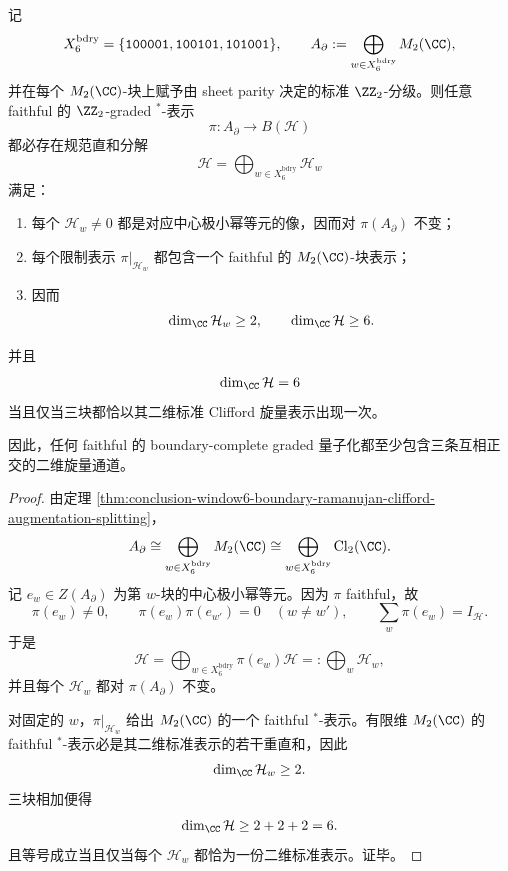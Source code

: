 \begin{theorem}\label{thm:conclusion-window6-boundary-triple-spinor-rigidity}
记
\[
X_6^{\mathrm{bdry}}=\{\texttt{100001},\texttt{100101},\texttt{101001}\},
\qquad
A_{\partial}:=\bigoplus_{w\in X_6^{\mathrm{bdry}}}M_2(\CC),
\]
并在每个 \(M_2(\CC)\)-块上赋予由 sheet parity 决定的标准 \(\ZZ_2\)-分级。则任意 faithful 的 \(\ZZ_2\)-graded \(^\ast\)-表示
\[
\pi:A_{\partial}\longrightarrow B(\mathcal H)
\]
都必存在规范直和分解
\[
\mathcal H=\bigoplus_{w\in X_6^{\mathrm{bdry}}}\mathcal H_w
\]
满足：
\begin{enumerate}
  \item 每个 \(\mathcal H_w\neq 0\) 都是对应中心极小幂等元的像，因而对 \(\pi(A_{\partial})\) 不变；
  \item 每个限制表示 \(\pi|_{\mathcal H_w}\) 都包含一个 faithful 的 \(M_2(\CC)\)-块表示；
  \item 因而
  \[
  \dim_{\CC}\mathcal H_w\ge 2,
  \qquad
  \dim_{\CC}\mathcal H\ge 6.
  \]
\end{enumerate}
并且
\[
\dim_{\CC}\mathcal H=6
\]
当且仅当三块都恰以其二维标准 Clifford 旋量表示出现一次。

因此，任何 faithful 的 boundary-complete graded 量子化都至少包含三条互相正交的二维旋量通道。
\end{theorem}
\begin{proof}
由定理 \ref{thm:conclusion-window6-boundary-ramanujan-clifford-augmentation-splitting}，
\[
A_{\partial}\cong \bigoplus_{w\in X_6^{\mathrm{bdry}}}M_2(\CC)
\cong
\bigoplus_{w\in X_6^{\mathrm{bdry}}}\mathrm{Cl}_2(\CC).
\]
记 \(e_w\in Z(A_{\partial})\) 为第 \(w\)-块的中心极小幂等元。因为 \(\pi\) faithful，故
\[
\pi(e_w)\neq 0,
\qquad
\pi(e_w)\pi(e_{w'})=0\quad (w\neq w'),
\qquad
\sum_w \pi(e_w)=I_{\mathcal H}.
\]
于是
\[
\mathcal H=\bigoplus_{w\in X_6^{\mathrm{bdry}}}\pi(e_w)\mathcal H=:\bigoplus_w \mathcal H_w,
\]
并且每个 \(\mathcal H_w\) 都对 \(\pi(A_{\partial})\) 不变。

对固定的 \(w\)，\(\pi|_{\mathcal H_w}\) 给出 \(M_2(\CC)\) 的一个 faithful \(^\ast\)-表示。有限维 \(M_2(\CC)\) 的 faithful \(^\ast\)-表示必是其二维标准表示的若干重直和，因此
\[
\dim_{\CC}\mathcal H_w\ge 2.
\]
三块相加便得
\[
\dim_{\CC}\mathcal H\ge 2+2+2=6.
\]
且等号成立当且仅当每个 \(\mathcal H_w\) 都恰为一份二维标准表示。证毕。
\end{proof}

